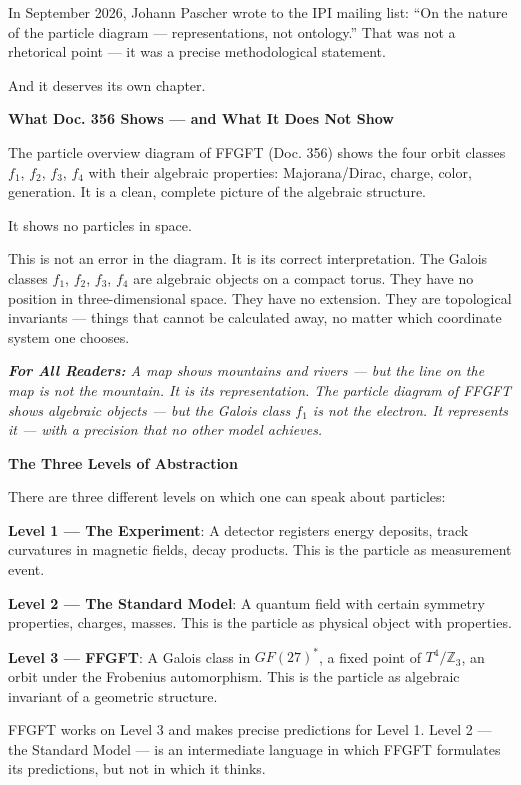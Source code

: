 \documentclass[11pt,oneside]{book}
\newenvironment{laierspur}{%
  \par\vspace{4pt}%
  \noindent\small\itshape\color{blue!60!black}%
  \textbf{For All Readers:}\enspace\ignorespaces}{%
  \par\vspace{4pt}\normalsize\normalfont\normalcolor}
\begin{document}
In September 2026, Johann Pascher wrote to the IPI mailing list:
\enquote{On the nature of the particle diagram — representations, not ontology.}
That was not a rhetorical point — it was a precise methodological statement.

And it deserves its own chapter.

\textbf{What Doc. 356 Shows — and What It Does Not Show}

The particle overview diagram of FFGFT (Doc. 356) shows the four orbit
classes {$f_1$, $f_2$, $f_3$, $f_4$} with their algebraic properties:
Majorana/Dirac, charge, color, generation. It is a clean, complete picture
of the algebraic structure.

It shows no particles in space.

This is not an error in the diagram. It is its correct interpretation. The
Galois classes {$f_1$, $f_2$, $f_3$, $f_4$} are algebraic objects on a compact torus.
They have no position in three-dimensional space. They have no extension.
They are topological invariants — things that cannot be calculated away, no
matter which coordinate system one chooses.

\begin{laierspur}
A map shows mountains and rivers — but the line on the map is not the
mountain. It is its representation. The particle diagram of FFGFT shows
algebraic objects — but the Galois class $f_1$ is not the electron. It
represents it — with a precision that no other model achieves.
\end{laierspur}

\textbf{The Three Levels of Abstraction}

There are three different levels on which one can speak about particles:

\textbf{Level 1 — The Experiment}: A detector registers energy deposits,
track curvatures in magnetic fields, decay products. This is the particle as
measurement event.

\textbf{Level 2 — The Standard Model}: A quantum field with certain symmetry
properties, charges, masses. This is the particle as physical object with
properties.

\textbf{Level 3 — FFGFT}: A Galois class in $GF(27)^*$, a fixed point of
$T^4/\mathbb{Z}_3$, an orbit under the Frobenius automorphism. This is the particle
as algebraic invariant of a geometric structure.

FFGFT works on Level 3 and makes precise predictions for Level 1.
Level 2 — the Standard Model — is an intermediate language in which FFGFT
formulates its predictions, but not in which it thinks.
\end{document}
